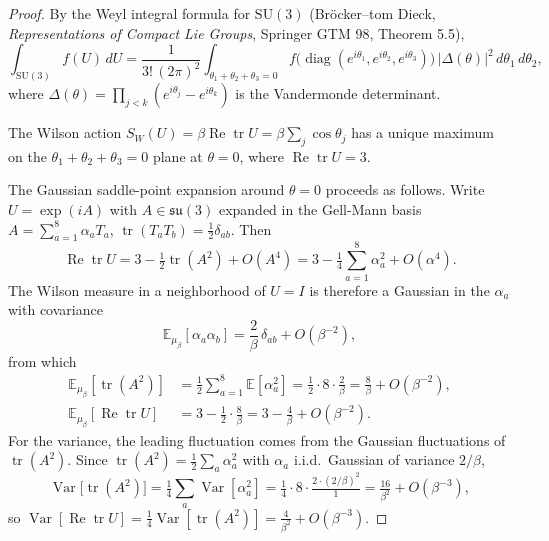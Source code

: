 \begin{proof}
By the Weyl integral formula for $\mathrm{SU}(3)$ (Bröcker--tom Dieck,
\emph{Representations of Compact Lie Groups}, Springer GTM 98,
Theorem 5.5),
\[
  \int_{\mathrm{SU}(3)} f(U)\, dU
  = \frac{1}{3!\,(2\pi)^{2}}
  \int_{\theta_{1}+\theta_{2}+\theta_{3}=0}
  f\!\bigl(\operatorname{diag}(e^{i\theta_{1}}, e^{i\theta_{2}},
  e^{i\theta_{3}})\bigr)\,
  |\Delta(\theta)|^{2}\, d\theta_{1}\, d\theta_{2},
\]
where
$\Delta(\theta) = \prod_{j<k}(e^{i\theta_{j}} - e^{i\theta_{k}})$
is the Vandermonde determinant.

The Wilson action $S_{W}(U) = \beta \operatorname{Re}\operatorname{tr}U
= \beta \sum_{j} \cos\theta_{j}$ has a unique maximum on the
$\theta_{1}+\theta_{2}+\theta_{3}=0$ plane at $\theta = 0$, where
$\operatorname{Re}\operatorname{tr}U = 3$.

The Gaussian saddle-point expansion around $\theta = 0$ proceeds as
follows. Write $U = \exp(iA)$ with $A \in \mathfrak{su}(3)$ expanded
in the Gell-Mann basis $A = \sum_{a=1}^{8} \alpha_{a} T_{a}$,
$\operatorname{tr}(T_{a} T_{b}) = \frac{1}{2}\delta_{ab}$. Then
\[
  \operatorname{Re}\operatorname{tr}U
  = 3 - \tfrac{1}{2}\operatorname{tr}(A^{2}) + O(A^{4})
  = 3 - \tfrac{1}{4}\sum_{a=1}^{8} \alpha_{a}^{2} + O(\alpha^{4}).
\]
The Wilson measure in a neighborhood of $U = I$ is therefore a
Gaussian in the $\alpha_{a}$ with covariance
\[
  \mathbb{E}_{\mu_{\beta}}[\alpha_{a}\alpha_{b}]
  = \frac{2}{\beta}\,\delta_{ab} + O(\beta^{-2}),
\]
from which
\begin{align*}
  \mathbb{E}_{\mu_{\beta}}[\operatorname{tr}(A^{2})]
  &= \tfrac{1}{2}\sum_{a=1}^{8}\mathbb{E}[\alpha_{a}^{2}]
   = \tfrac{1}{2}\cdot 8 \cdot \tfrac{2}{\beta}
   = \tfrac{8}{\beta} + O(\beta^{-2}),\\
  \mathbb{E}_{\mu_{\beta}}[\operatorname{Re}\operatorname{tr}U]
  &= 3 - \tfrac{1}{2}\cdot\tfrac{8}{\beta}
   = 3 - \tfrac{4}{\beta} + O(\beta^{-2}).
\end{align*}
For the variance, the leading fluctuation comes from the Gaussian
fluctuations of $\operatorname{tr}(A^{2})$. Since
$\operatorname{tr}(A^{2}) = \frac{1}{2}\sum_{a}\alpha_{a}^{2}$ with
$\alpha_{a}$ i.i.d.\ Gaussian of variance $2/\beta$,
\[
  \operatorname{Var}\!\bigl[\operatorname{tr}(A^{2})\bigr]
  = \tfrac{1}{4}\sum_{a}\operatorname{Var}[\alpha_{a}^{2}]
  = \tfrac{1}{4}\cdot 8 \cdot \tfrac{2 \cdot (2/\beta)^{2}}{1}
  = \tfrac{16}{\beta^{2}} + O(\beta^{-3}),
\]
so $\operatorname{Var}[\operatorname{Re}\operatorname{tr}U]
= \frac{1}{4}\operatorname{Var}[\operatorname{tr}(A^{2})]
= \frac{4}{\beta^{2}} + O(\beta^{-3})$. \end{proof}

